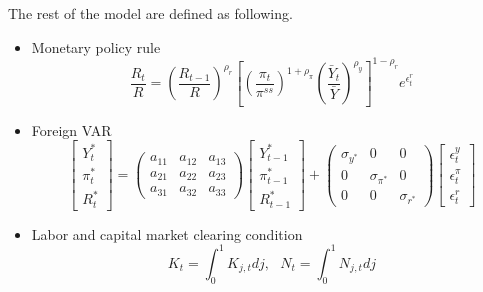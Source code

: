 \documentclass[11pt, a4paper]{article}
\begin{document}
  The rest of the model are defined as following.
  \begin{itemize}
  
\item Monetary policy rule 
\begin{equation} \frac{R_t}{{R}} = \left( \frac{R_{t-1}}{{R}} \right) ^{\rho_r} \left[ \left(\frac{\pi_t}{{\pi}^{ss}} \right)^{1+\rho_{\pi}} \left(\frac{\bar{Y}_t}{\bar{Y}} \right)^{\rho_{y}} \right]^{1-\rho_r}e^{\epsilon_t^r} \end{equation}

\item Foreign VAR
\begin{equation} \begin{bmatrix} Y_t^* \\ \pi_t^* \\ R_t^* \end{bmatrix} = 
\begin{pmatrix}
a_{11} & a_{12} & a_{13} \\
a_{21} & a_{22} & a_{23} \\
a_{31} & a_{32} & a_{33} 
\end{pmatrix} 
\begin{bmatrix} Y_{t-1}^* \\ \pi_{t-1}^* \\ R_{t-1}^* \end{bmatrix}
+ \begin{pmatrix}
\sigma_{y^*} & 0 & 0 \\
0 & \sigma_{\pi^*} & 0 \\
0 & 0 & \sigma_{r^*} 
\end{pmatrix} \begin{bmatrix}
\epsilon_t^y \\
\epsilon_t^{\pi} \\
\epsilon_t^r 
\end{bmatrix} \end{equation}

\item Labor and capital market clearing condition
\[K_t = \int_0^1 K_{j,t} dj, ~~~ N_t = \int_0^1 N_{j,t} dj\]


\end{itemize}
\end{document}
